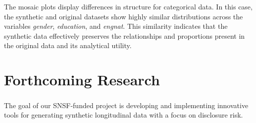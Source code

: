 \documentclass[a0,portrait]{a0poster}
\begin{document}
\begin{multicols}{3}
\vspace{1cm}

The mosaic plots display differences in structure for categorical data. In this case, the synthetic and original datasets show highly similar distributions across the variables \textit{gender}, \textit{education}, and \textit{engnat}. This similarity indicates that the synthetic data effectively preserves the relationships and proportions present in the original data and its analytical utility.

\section{Forthcoming Research}

The goal of our SNSF\textsuperscript{}-funded project is developing and implementing innovative tools for generating synthetic longitudinal data with a focus on disclosure risk.




\singlespacing
\small
%
%



\end{multicols}
\end{document}
